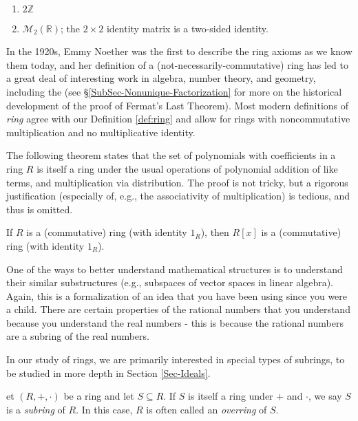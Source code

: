 \documentclass[english,course]{lecture}
\newenvironment{solution}[1][Solution]{\begin{trivlist}\pushQED{\qed}\item[\hskip \labelsep  \bfseries #1{}.\hspace{10pt}]}{\popQED\end{trivlist}}\renewcommand{\qedsymbol}{$\checkmark$}{\newenvironment{answer}{\renewcommand\qedsymbol{$\blacklozenge$}\begin{proof}[Answer]}{\end{proof}}}\newenvironment{answer}[1][Answer]{\begin{trivlist}\pushQED{\qed}\item[\hskip \labelsep  \bfseries #1{}.\hspace{10pt}]}{\popQED\end{trivlist}}\renewcommand{\qedsymbol}{$\lozenge$}
\theoremstyle{plain}
\newenvironment{definition}[1]
  {\renewcommand\theinnerdefinition{#1}\innerdefinition}
  {\endinnerdefinition}
\def\Z{{\mathbb Z}}
\def\R{{\mathbb R}}
\def\presnotes{}
\begin{document}
\begin{solution}
	\
	
	\begin{enumerate}
		\item $2\Z$
		\item $\mathcal{M}_2(\R)$; the $2\times 2$ identity matrix is a two-sided identity.
	\end{enumerate}
\end{solution}

\presnotes

In the 1920s, Emmy Noether was the first to describe the ring axioms as we know them today, and her definition of a (not-necessarily-commutative) ring has led to a great deal of interesting work in algebra, number theory, and geometry, including the (see \S \ref{SubSec-Nonunique-Factorization} for more on the historical development of the proof of Fermat's Last Theorem). 
Most modern definitions of \emph{ring} agree with our Definition \ref{def:ring} and allow for rings with noncommutative multiplication and no multiplicative identity.


The following theorem states that the set of polynomials with coefficients in a ring $R$ is itself a ring under the usual operations of polynomial addition of like terms, and multiplication via distribution.
The proof is not tricky, but a rigorous justification (especially of, e.g., the associativity of multiplication) is tedious, and thus is omitted. 


\begin{unnumberedtheorem}
	If $R$ is a (commutative) ring (with identity $1_R$), then $R[x]$ is a (commutative) ring (with identity $1_R$).
\end{unnumberedtheorem}

One of the ways to better understand mathematical structures is to understand their similar substructures (e.g., subspaces of vector spaces in linear algebra). Again, this is a formalization of an idea that you have been using since you were a child. There are certain properties of the rational numbers that you understand because you understand the real numbers - this is because the rational numbers are a subring of the real numbers.

In our study of rings, we are primarily interested in special types of subrings, to be studied in more depth in Section \ref{Sec-Ideals}.

\begin{definition}
	Let $(R,+,\cdot)$ be a ring and let $S\subseteq R$.
	If $S$ is itself a ring under $+$ and $\cdot$, we say $S$ is a \emph{subring} of $R$. 
	In this case, $R$ is often called an \emph{overring} of $S$.
\end{definition}
\end{document}
